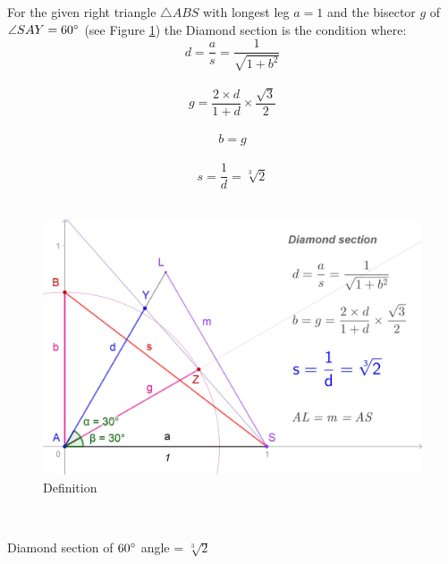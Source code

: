 \documentclass[12pt, letterpaper, oneside]{report}
\begin{document}
For the given right triangle $\triangle ABS$ with longest leg $a=1$ and  the bisector $g$ of $\angle SAY=60\degree$ (see Figure \ref{fig:definition}) the Diamond section is the condition where:
\begin{equation}
d=\frac{a}{s}=\frac{1}{\sqrt{1+b^{2}}}
\end{equation}
\\
\begin{equation}
 g=\frac{2\times d}{1+d}\times\frac{\sqrt{3}}{2}
\end{equation}
\\
\begin{equation}
b=g
\end{equation}
\\
\begin{equation}
s=\dfrac{1}{d}=\sqrt[3]{2}
\end{equation}
\\
\begin{figure}[h]
	\centering
	\includegraphics[width=0.7\linewidth]{ds_new_def.jpg}
	\caption{Definition}
	\label{fig:definition}
\end{figure} \\

\begin{center}
	\large{Diamond section of  $60 \degree$ angle = $\sqrt[3]{2}$ }
\\
\end{center}
\newpage
 
\end{document}
